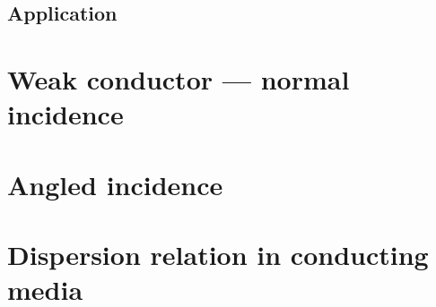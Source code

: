 \documentclass[11pt,letter, swedish, english
]{article}
\begin{document}


\subsection{Application}








\section{Weak conductor --- normal incidence}


\section{Angled incidence}


\section{Dispersion relation in conducting media}
\end{document}
